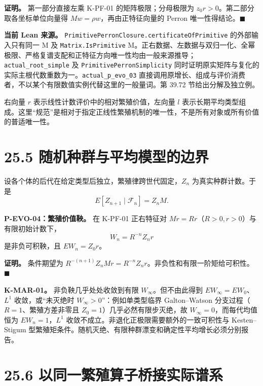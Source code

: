\documentclass[
  11pt,
  oneside]{book}
\begin{document}
\textbf{证明。} 第一部分直接左乘 K-PF-01 的矩阵极限；分母极限为 \(z_0r>0\)。第二部分取各坐标单位向量得 \(Mw=\rho w\)，再由正特征向量的 Perron 唯一性得结论。\(\blacksquare\)

\textbf{当前 Lean 来源。} \nolinkurl{PrimitivePerronClosure.certificateOfPrimitive} 的外部输入只有同一 M 及 \nolinkurl{Matrix.IsPrimitive} M。正右数据、左数据与双归一化、全幂极限、严格复谱支配和正特征方向唯一性均由一般来源推导；\nolinkurl{actual_root_simple} 及 \nolinkurl{PrimitivePerronSimplicity} 同时证明原实矩阵与复化的实际主根代数重数为一。\nolinkurl{actual_p_evo_03} 直接调用原增长、组成与评价消费者，不以某个有限数值实例代替这里的一般量词。第 39.72 节给出分解及独立例。

右向量 \(r\) 表示线性计数评价中的相对繁殖价值，左向量 \(l\) 表示长期平均类型组成。这里``规范''是相对于指定正线性繁殖机制的唯一性，不是所有对象或所有价值的普适唯一性。

\section{25.5 随机种群与平均模型的边界}\label{ux968fux673aux79cdux7fa4ux4e0eux5e73ux5747ux6a21ux578bux7684ux8fb9ux754c}

设各个体的后代在给定类型后独立，繁殖律跨世代固定，\(Z_n\) 为真实种群计数。于是 \[E[Z_{n+1}\mid\mathcal F_n]=Z_nM.\]

\hypertarget{p-evo-04}{}\label{p-evo-04}

\textbf{P-EVO-04：繁殖价值鞅。} 在 K-PF-01 正右特征对 \(Mr=Rr\)（\(R>0,r>0\)）与有限初始计数下， \[W_n=R^{-n}Z_nr\] 是非负可积鞅，且 \(EW_n=Z_0r\)。

\textbf{证明。} 条件期望为 \(R^{-(n+1)}Z_nMr=R^{-n}Z_nr\)。非负性和有限一阶矩给可积性。\(\blacksquare\)

\textbf{K-MAR-01。} 非负鞅几乎处处收敛到有限 \(W_\infty\)。但不由此得到 \(EW_\infty=EW_0\)、\(L^1\) 收敛，或``未灭绝时 \(W_\infty>0\)''：例如单类型临界 Galton--Watson 分支过程（\(R=1\)、繁殖方差非零且 \(Z_0=1\)）几乎必然有限步灭绝，故 \(W_\infty=0\)，而每代均值恒为 \(EW_n=1\)，\(L^1\) 收敛不成立。非退化正极限需要额外的一致可积性与 Kesten--Stigum 型繁殖矩条件。随机灭绝、有限种群漂变和确定性平均增长必须分别报告。

\section{25.6 以同一繁殖算子桥接实际谱系}\label{ux4ee5ux540cux4e00ux7e41ux6b96ux7b97ux5b50ux6865ux63a5ux5b9eux9645ux8c31ux7cfb}
\end{document}
